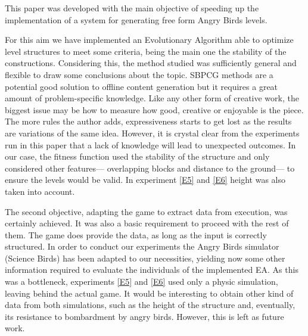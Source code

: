 \documentclass[a4paper,twoside]{article}
\begin{document}
This paper was developed with the main objective of speeding up the
implementation of a system for generating free form Angry Birds
levels. 

For this aim we have implemented an Evolutionary Algorithm able to optimize 
level structures to meet some criteria, being the main one the stability of the 
constructions.
Considering this, the method studied was
sufficiently general and flexible to draw some conclusions about the
topic. SBPCG methods are a potential good solution to offline content
generation but it requires a great amount of problem-specific
knowledge. Like any other form of creative work, the biggest issue may
be how to measure how good, creative or enjoyable is the piece. The
more rules the author adds, expressiveness starts to get lost as the
results are variations of the same idea. However, it is crystal clear
from the experiments run in this paper that a lack of knowledge
will lead to unexpected outcomes.
In our case, the fitness function used the 
stability of the structure and only considered other features--- overlapping 
blocks and distance to the ground--- to ensure the levels would be valid.
In experiment \ref{E5} and \ref{E6} height was also taken into account.


The second objective, adapting the game to extract data from execution, was 
certainly achieved. It was also a basic requirement to proceed with the rest of 
them. The game does provide the data, as long as the input is correctly 
structured. 
In order to conduct our experiments the Angry Birds simulator (Science Birds) 
has been adapted to our necessities, yielding now some  other information 
required to evaluate the individuals of the implemented EA. As this was a 
bottleneck, experiments \ref{E5} and \ref{E6} used only a physic simulation,
leaving behind the actual game.
It would be interesting to obtain other kind of data from both simulations,
such as the height of the structure and, eventually, its resistance to
bombardment by angry birds. However, this is left as future work.
\end{document}
